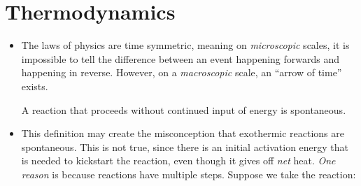 \section{Thermodynamics}
\begin{itemize}
    \item The laws of physics are time symmetric, meaning on \textit{microscopic} scales, it is impossible to tell the difference between an event happening forwards and happening in reverse. However, on a \textit{macroscopic} scale, an ``arrow of time'' exists.
    \begin{definition}
        A reaction that proceeds without continued input of energy is spontaneous.
    \end{definition}
    \item This definition may create the misconception that exothermic reactions are spontaneous. This is not true, since there is an initial activation energy that is needed to kickstart the reaction, even though it gives off \textit{net} heat. \textit{One reason} is because reactions have multiple steps. Suppose we take the reaction:
    

\end{itemize}
